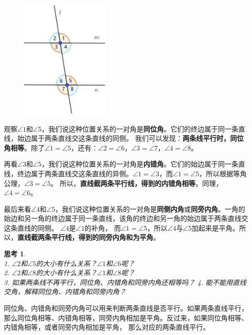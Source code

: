 \documentclass[12pt,UTF8]{ctexbook}
\newtheorem{sk}{思考}[section]
\begin{document}
\begin{figure} %
    \includegraphics[width=0.4\textwidth]{三线八角.png}
\end{figure}

观察$\angle 1$和$\angle 5$，我们说这种位置关系的一对角是\textbf{同位角}。它们的终边属于同一条直线，始边属于两条直线交这条直线的同侧。
我们可以发现：\textbf{两条线平行时，同位角相等}。除了$\angle 1 = \angle 5$，还有：$\angle 2 = \angle 6$，$\angle 3 = \angle 7$，$\angle 4 = \angle 8$。

再看$\angle 3$和$\angle 5$，我们说这种位置关系的一对角是\textbf{内错角}。它们的始边属于同一条直线，终边属于两条直线交这条直线的异侧。$\angle 1 = \angle 3$，而$\angle 1 = \angle 5$，所以根据等角公理，$\angle 3 = \angle 5$。
所以，\textbf{直线截两条平行线，得到的内错角相等}。同理，$\angle 4 = \angle 6$。

最后来看$\angle 4$和$\angle 5$，我们说这种位置关系的一对角是\textbf{同侧内角}或\textbf{同旁内角}。一角的始边和另一角的终边属于同一条直线，该角的终边和另一角的始边属于两条直线交这条直线的同侧。
$\angle 4$是$\angle 1$的补角，
而$\angle 1 = \angle 5$，所以$\angle 4$与$\angle 5$加起来是平角。所以，\textbf{直线截两条平行线，得到的同旁内角和为平角}。

\begin{sk}\label{sk:1-1-0}
    \mbox{}\\
    1. $\angle 2$和$\angle 5$的大小有什么关系？$\angle 1$和$\angle 6$呢？\\
    2. $\angle 2$和$\angle 8$的大小有什么关系？$\angle 1$和$\angle 8$呢？\\
    3. 如果两条线不再平行，同位角、内错角和同旁内角还相等吗？
    4. 能不能用直线交角，解释同位角、内错角和同旁内角？
\end{sk}

同位角、内错角和同旁内角可以用来判断两条直线是否平行。如果两条直线平行，
那么同位角相等、内错角相等，同旁内角相加是平角。反过来，如果同位角相等、内错角相等，或者同旁内角相加是平角，
那么对应的两条直线平行。
\end{document}
